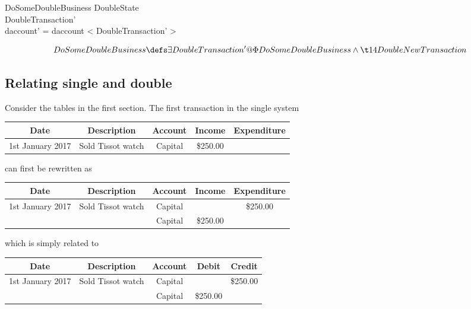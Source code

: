 \documentclass[11pt]{amsart}
\begin{document}
\begin{schema}{\Phi DoSomeDoubleBusiness}
\Delta DoubleState\\
DoubleTransaction'\\
\where
daccount' = daccount \cat < \theta DoubleTransaction' >
\end{schema}

\[
DoSomeDoubleBusiness \defs \exists DoubleTransaction' @ \Phi DoSomeDoubleBusiness \land\\
\t14 DoubleNewTransaction
\]

\subsection{Relating single and double}

Consider the tables in the first section. The first transaction in the single system

\begin{center}
\begin{tabular}{|c|c|c|c|c|}
Date & Description & Account & Income & Expenditure \\
\hline \hline
1st January 2017 & Sold Tissot watch & Capital & \$250.00 & \\
\end{tabular}
\end{center}
\label{default}

can first be rewritten as

\begin{center}
\begin{tabular}{|c|c|c|c|c|}
Date & Description & Account & Income & Expenditure\\
\hline \hline
1st January 2017 & Sold Tissot watch & Capital &   &\$250.00 \\
\hline
& &  Capital & \$250.00 &  \\
\end{tabular}
\end{center}
\label{default}

which is simply related to

\begin{center}
\begin{tabular}{|c|c|c|c|c|}
Date & Description & Account & Debit & Credit\\
\hline \hline
1st January 2017 & Sold Tissot watch & Capital &   &\$250.00 \\
\hline
& &  Capital & \$250.00 &  \\
\end{tabular}
\end{center}
\label{default}
\end{document}
